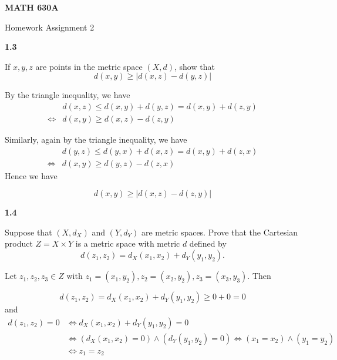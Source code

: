 \documentclass[12pt,a4paper]{article}
\author{Jackson Autry}
\begin{document}

	
\begin{center}
	\textbf{MATH 630A} %
	
		Homework Assignment 2		%
	
\end{center}
\textbf{1.3}
\begin{ques}
	If $x,y,z$ are points in the metric space $(X,d)$, show that
	$$d(x,y)\ge \vert d(x,z) - d(y,z)\vert$$
\end{ques}
	
	By the triangle inequality, we have
	\begin{align*}
	& d(x,z) \le d(x,y) + d(y,z) = d(x,y) + d(z,y)\\
	\Longleftrightarrow & d(x,y) \ge d(x,z) - d(z,y)
	\end{align*}
	
	Similarly, again by the triangle inequality, we have
	\begin{align*}
	& d(y,z) \le d(y,x) + d(x,z) = d(x,y) + d(z,x)\\
	\Longleftrightarrow & d(x,y) \ge d(y,z) - d(z,x)
	\end{align*}
	Hence we have
	
	$$d(x,y) \ge \vert d(x,z) - d(z,y) \vert $$
	
\textbf{1.4}
\begin{ques}
	Suppose that $(X,d_X)$ and $(Y,d_Y)$ are metric spaces. Prove that the Cartesian product $Z = X \times Y$ is a metric space with metric $d$ defined by 
	$$d(z_1,z_2) = d_X(x_1,x_2) + d_Y(y_1,y_2).$$
\end{ques}
	
	Let $z_1,z_2,z_3 \in Z$ with $z_1 = (x_1,y_2), z_2 = (x_2,y_2), z_3 = (x_3,y_3)$. Then
	
	\[
	d(z_1,z_2) = d_X(x_1,x_2) + d_Y(y_1,y_2) \ge 0 + 0 = 0
	\]
	and
	\begin{align*}
	d(z_1,z_2) = 0 & \Longleftrightarrow d_X(x_1,x_2) + d_Y(y_1,y_2) = 0 \\
	& \Longleftrightarrow (d_X(x_1,x_2) = 0) \land (d_Y(y_1,y_2) = 0) \Longleftrightarrow (x_1 = x_2) \land (y_1 = y_2) \\
	& \Longleftrightarrow z_1 = z_2
	\end{align*}
	
\end{document}

